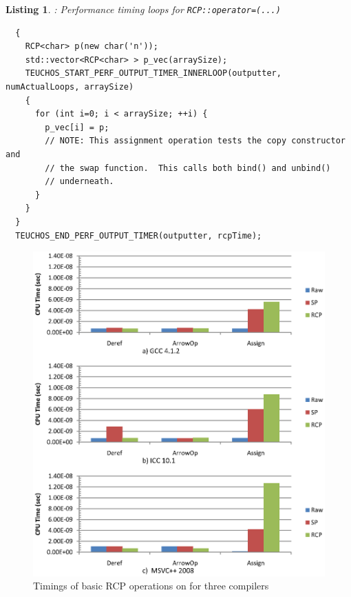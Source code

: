 \documentclass[pdf,ps2pdf,11pt]{SANDreport}
\newtheorem{listing}{Listing}
\begin{document}
\begin{listing}: Performance timing loops for {}\texttt{RCP::operator=(...)} \\
\label{listing:RCP-assignment-timing}
{\small\begin{verbatim}
  {
    RCP<char> p(new char('n'));
    std::vector<RCP<char> > p_vec(arraySize);
    TEUCHOS_START_PERF_OUTPUT_TIMER_INNERLOOP(outputter, numActualLoops, arraySize)
    {
      for (int i=0; i < arraySize; ++i) {
        p_vec[i] = p;
        // NOTE: This assignment operation tests the copy constructor and
        // the swap function.  This calls both bind() and unbind()
        // underneath.
      }
    }
  }
  TEUCHOS_END_PERF_OUTPUT_TIMER(outputter, rcpTime);
\end{verbatim}}
\end{listing}


{\bsinglespace
\begin{figure}
\begin{center}
\includegraphics*[angle=0,scale=1.00]{RCPTimings}
\end{center}
\caption{
\label{fig:RCPTimings}
Timings of basic RCP operations on for three compilers}
\end{figure}
\esinglespace}
\end{document}
